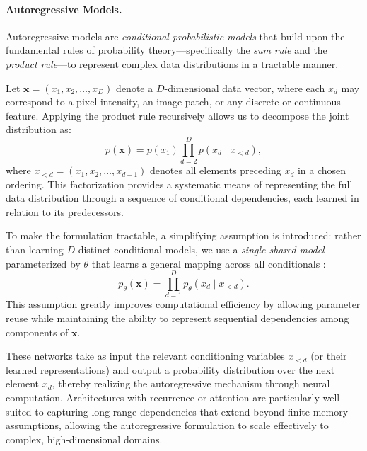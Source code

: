 \paragraph{Autoregressive Models.}
Autoregressive models \citep{dalal2019autoregressive} are \emph{conditional probabilistic models} that build upon the fundamental rules of probability theory—specifically the \emph{sum rule} and the \emph{product rule}—to represent complex data distributions in a tractable manner.

Let $\mathbf{x} = (x_1, x_2, \ldots, x_D)$ denote a $D$-dimensional data vector, where each $x_d$ may correspond to a pixel intensity, an image patch, or any discrete or continuous feature. Applying the product rule recursively allows us to decompose the joint distribution as:
\begin{equation}
p(\mathbf{x}) = p(x_1) \prod_{d=2}^{D} p(x_d \mid x_{<d}),
\end{equation}
where $x_{<d} = (x_1, x_2, \ldots, x_{d-1})$ denotes all elements preceding $x_d$ in a chosen ordering. This factorization provides a systematic means of representing the full data distribution through a sequence of conditional dependencies, each learned in relation to its predecessors.

To make the formulation tractable, a simplifying assumption is introduced: rather than learning $D$ distinct conditional models, we use a \emph{single shared model} parameterized by $\theta$ that learns a general mapping across all conditionals \citep{tomczak2024deep, xiong2024autoregressive}:
\begin{equation}
p_\theta(\mathbf{x}) = \prod_{d=1}^{D} p_\theta(x_d \mid x_{<d}).
\end{equation}
This assumption greatly improves computational efficiency by allowing parameter reuse while maintaining the ability to represent sequential dependencies among components of $\mathbf{x}$.

These networks take as input the relevant conditioning variables $x_{<d}$ (or their learned representations) and output a probability distribution over the next element $x_d$, thereby realizing the autoregressive mechanism through neural computation. Architectures with recurrence \citep{oord2016pixel} or attention \citep{vaswani2017attention} are particularly well-suited to capturing long-range dependencies that extend beyond finite-memory assumptions, allowing the autoregressive formulation to scale effectively to complex, high-dimensional domains.

